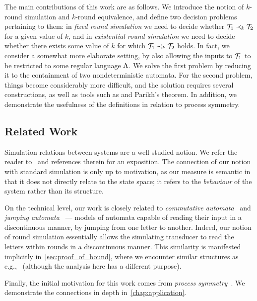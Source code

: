 The main contributions of this work are as follows. We introduce the notion of $k$-round simulation and $k$-round equivalence, and define two decision problems pertaining to them: in \emph{fixed round simulation} we need to decide whether $\mathcal{T}_1\prec_k \mathcal{T}_2$ for a given value of $k$, and in \emph{existential round simulation} we need to decide whether there exists some value of $k$ for which $\mathcal{T}_1\prec_k \mathcal{T}_2$ holds. In fact, we consider a somewhat more elaborate setting, by also allowing the inputs to $\mathcal{T}_1$ to be restricted to some regular language $\Lambda$.
We solve the first problem by reducing it to the containment of two nondeterministic automata. For the second problem, things become considerably more difficult, and the solution requires several constructions, as well as tools such as  and Parikh's theorem. 
In addition, we demonstrate the usefulness of the definitions in relation to process symmetry.

\subsection*{Related Work}
Simulation relations between systems are a well studied notion. We refer the reader to~\cite[Chapter 13]{Clarke2018a} and references therein for an exposition. The connection of our notion with standard simulation is only up to motivation, as our measure is semantic in that it does not directly relate to the state space; it refers to the \emph{behaviour} of the system rather than its structure.

On the technical level, our work is closely related to \emph{commutative automata}~\cite{Brzozowski1973} and \emph{jumping automata}~\cite{Fernau2015,Meduna2012} --- models of automata capable of reading their input in a discontinuous manner, by jumping from one letter to another. Indeed, our notion of round simulation essentially allows the simulating transducer to read the letters within rounds in a discontinuous manner. This similarity is manifested implicitly in~\cref{sec:proof_of_bound}, where we encounter similar structures as e.g.,~\cite{Hoffmann2020} (although the analysis here has a different purpose).

Finally, the initial motivation for this work comes from \emph{process symmetry}~\cite{Almagor2020b,Clarke1996,Emerson1996,Ip1996,Lin2016}. We demonstrate the connections in depth in~\cref{chap:application}.

